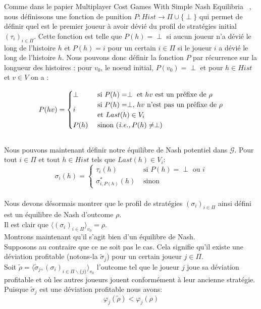 \begin{demonstration}
\begin{itemize}
	Comme dans le papier \og Multiplayer Cost Games With Simple Nash Equilibria \fg~\cite{DBLP:conf/lfcs/BrihayePS13}, nous définissons une fonction de punition \linebreak\mbox{$P:Hist \rightarrow \Pi\cup \{ \perp \}$} qui permet de définir quel est le premier joueur à avoir dévié du profil de stratégies initial $(\tau_i)_{i\in\Pi}$. Cette fonction est telle que $P(h) = \perp$ si aucun joueur n'a dévié le long de l'histoire $h$ et $P(h) = i$ pour un certain $i \in \Pi$ si le joueur $i$ a dévié le long de l'histoire $h$. Nous pouvons donc définir la fonction $P$ par récurrence sur la longueur des histoires : pour $v_0$, le noeud initial, $P(v_0) = \perp$  et pour $h \in Hist$ et $v\in V$ on a :

\setlength{\overfullrule}{0pt}
	$$
	P(hv) = \begin{cases}
			\perp & \text{ si } P(h) = \perp \text{ et } hv \text{ est un préfixe de } \rho \\
			\multirow{2}{*}{$i$} & \text{ si } P(h) = \perp ,\, hv \text{ n'est pas un préfixe de }\rho \\
			                   & \text{ et } Last(h)\in V_i \\
			P(h) & \text{ sinon (\emph{i.e.,}}\, P(h)\neq \perp) \end{cases}
	$$\\
	
	
\setlength{\overfullrule}{10pt}	
	Nous pouvons maintenant définir notre équilibre de Nash potentiel dans $\mathcal{G}$. Pour tout $i\in \Pi$ et tout $h\in Hist$ tels que $Last(h)\in V_i$:
	$$\sigma_i(h)= \begin{cases}
					\tau_i(h) & \text{ si }P(h)= \perp \text{ ou }i \\
					\sigma^*_{i,P(h)}(h) & \text{ sinon }\end{cases}$$\\
					
	Nous devons désormais montrer que le profil de stratégies $(\sigma_i)_{i\in\Pi}$ ainsi défini est un équilibre de Nash d'outcome $\rho$.\\
	Il est clair que $\langle (\sigma_i)_{i\in\Pi} \rangle_{v_0} = \rho$.\\
	Montrons maintenant qu'il s'agit bien d'un équilibre de Nash.\\
	\noindent Supposons au contraire que ce ne soit pas le cas. Cela signifie qu'il existe une déviation profitable (notons-la $\tilde{\sigma}_j$) pour un certain joueur $j \in\Pi$.\\ 
		\noindent Soit $\tilde{\rho} = \langle \tilde{\sigma}_j , (\sigma_i)_{i \in \Pi \backslash \{j \}} \rangle_{v_0}$ l'outcome tel que le joueur $j$ joue sa déviation profitable et où les autres joueurs jouent conformément à leur ancienne stratégie.
		Puisque $\tilde{\sigma}_j$ est une déviation profitable nous avons: 
		\begin{equation}
			\label{eq:questEq4}
			\varphi_j(\tilde{\rho}) < \varphi_j(\rho)
		\end{equation}
		

\end{itemize}
\end{demonstration}
